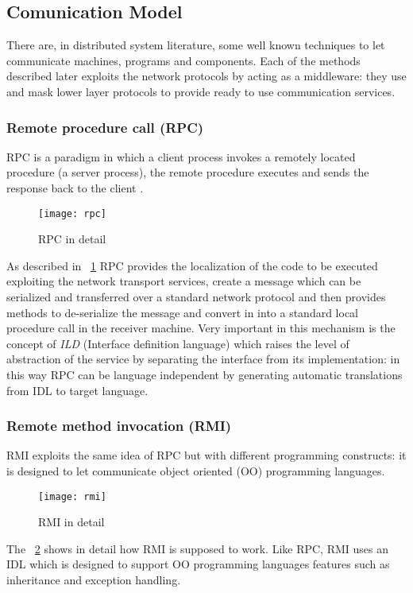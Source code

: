\subsection{Comunication Model}
\par
There are, in distributed system literature, some well known techniques to let communicate machines, programs and components. Each of the methods described later exploits the network protocols by acting as a middleware: they use and mask lower layer protocols to provide ready to use communication services.

\subsubsection{Remote procedure call (RPC)} RPC is a paradigm in which a client process invokes a remotely located procedure (a server process), the remote procedure executes and sends the response back to the client \cite{Jerome2009Principles}.
\begin{figure}[h]
	\centering
	\texttt{[image: rpc]}
	\caption{RPC in detail}
	\label{fig:2.10}
\end{figure} 
As described in \figurename~\ref{fig:2.10} RPC provides the localization of the code to be executed exploiting the network transport services, create a message which can be serialized and transferred over a standard network protocol and then provides methods to de-serialize the message and convert in into a standard local procedure call in the receiver machine. Very important in this mechanism is the concept of \textit{ILD} (Interface definition language) which raises the level of abstraction of the service by separating the interface from its implementation: in this way RPC can be language independent by generating automatic translations from IDL to target language.  
\subsubsection{Remote method invocation (RMI)} \label{RMI} RMI exploits the same idea of RPC but with different programming constructs: it is designed to let communicate object oriented (OO) programming languages.
\begin{figure}[h]
	\centering
	\texttt{[image: rmi]}
	\caption{RMI in detail}
	\label{fig:2.11}
\end{figure} 
The \figurename~\ref{fig:2.11} shows in detail how RMI is supposed to work. Like RPC, RMI uses an IDL which is designed to support OO programming languages features such as inheritance and exception handling.

